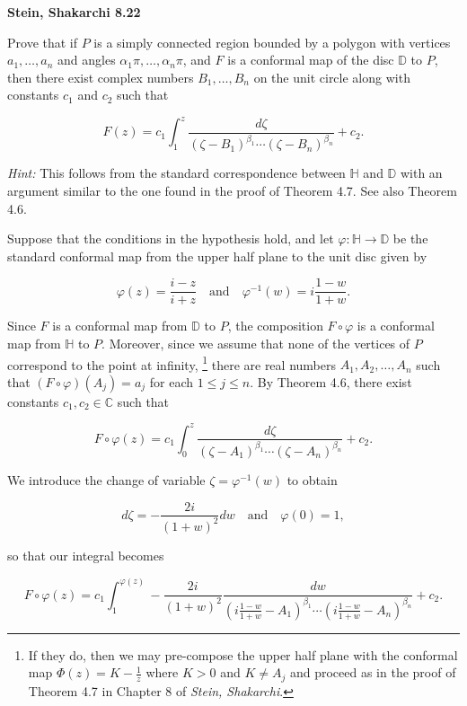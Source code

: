 \textbf{Stein, Shakarchi 8.22}

Prove that if $P$ is a simply connected region bounded by a polygon with vertices $a_1, \dots, a_n$ and angles 
$\alpha_1 \pi, \dots, \alpha_n \pi$, and $F$ is a conformal map of the disc $\mathbb{D}$ to $P$, then there exist 
complex numbers $B_1, \dots, B_n$ on the unit circle along with constants $c_1$ and $c_2$ such that

$$
F(z) = c_1 \int_1^z \frac{d\zeta}{(\zeta - B_1)^{\beta_1} \cdots (\zeta - B_n)^{\beta_n}} + c_2.
$$

\textit{Hint: } This follows from the standard correspondence between $\mathbb{H}$ and $\mathbb{D}$ with an argument 
similar to the one found in the proof of Theorem 4.7. See also Theorem 4.6.

\begin{solution}
  Suppose that the conditions in the hypothesis hold, and let $\varphi: \mathbb{H} \to \mathbb{D}$ be the standard 
  conformal map from the upper half plane to the unit disc given by

  $$
  \varphi(z) = \frac{i - z}{i + z} \quad \text{and} \quad \varphi^{-1}(w) = i \frac{1 - w}{1 + w}.
  $$

  Since $F$ is a conformal map from $\mathbb{D}$ to $P$, the composition $F \circ \varphi$ is a conformal map from 
  $\mathbb{H}$ to $P$. Moreover, since we assume that none of the vertices of $P$ correspond to the point at infinity,
  \footnote{
    If they do, then we may pre-compose the upper half plane with the conformal map $\Phi(z) = K - \frac{1}{z}$ where 
    $K > 0$ and $K \neq A_j$ and proceed as in the proof of Theorem 4.7 in Chapter 8 of \textit{Stein, Shakarchi}.
  } there are real numbers $A_1, A_2, \dots, A_n$ such that $(F \circ \varphi) (A_j) = a_j$ for each $1 \le j \le n$. By 
  Theorem 4.6, there exist constants $c_1, c_2 \in \mathbb{C}$ such that

  $$
  F \circ \varphi(z) = c_1 \int_0^z \frac{d\zeta}{(\zeta - A_1)^{\beta_1} \cdots (\zeta - A_n)^{\beta_n}} + c_2.
  $$

  We introduce the change of variable $\zeta = \varphi^{-1}(w)$ to obtain

  $$
  d\zeta = -\frac{2i}{(1 + w)^2} dw \quad \text{and} \quad \varphi(0) = 1,
  $$

  so that our integral becomes

  $$
  F \circ \varphi(z) = c_1 \int_1^{\varphi(z)} -\frac{2 i }{(1 + w)^2} \frac{dw}{\left(i \frac{1 - w}{1 + w} - A_1\right)^{\beta_1} \cdots \left(i \frac{1 - w}{1 + w}  - A_n\right)^{\beta_n}} + c_2.
  $$


\end{solution}
